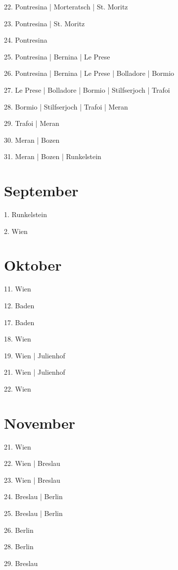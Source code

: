 \documentclass[twoside=false,titlepage=false,open=any, parskip=never, fontsize=10pt, headings=small, chapterprefix=false, appendixprefix=false, DIV=15]{scrbook}
\begin{document}
\begin{multicols}{3}
            22. Pontresina | Morteratsch | St. Moritz\par
            23. Pontresina | St. Moritz\par
            24. Pontresina\par
            25. Pontresina | Bernina | Le Prese\par
            26. Pontresina | Bernina | Le Prese | Bolladore | Bormio\par
            27. Le Prese | Bolladore | Bormio | Stilfserjoch | Trafoi\par
            28. Bormio | Stilfserjoch | Trafoi | Meran\par
            29. Trafoi | Meran\par
            30. Meran | Bozen\par
            31. Meran | Bozen | Runkelstein\par
            \section*{September}
            1. Runkelstein\par
            2. Wien\par
            \section*{Oktober}
            11. Wien\par
            12. Baden\par
            17. Baden\par
            18. Wien\par
            19. Wien | Julienhof\par
            21. Wien | Julienhof\par
            22. Wien\par
            \section*{November}
            21. Wien\par
            22. Wien | Breslau\par
            23. Wien | Breslau\par
            24. Breslau | Berlin\par
            25. Breslau | Berlin\par
            26. Berlin\par
            28. Berlin\par
            29. Breslau\par

\end{multicols}
\end{document}
